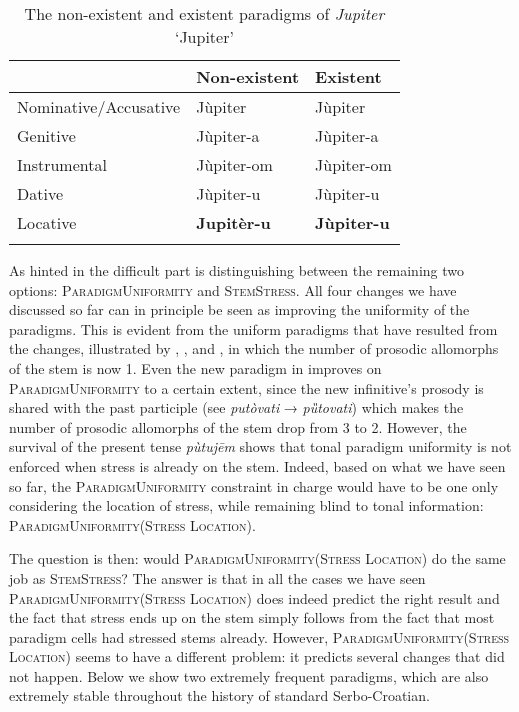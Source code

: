 \documentclass[output=paper,modfonts,nonflat
]{langsci/langscibook}
\begin{document}
\begin{table}
\caption{The non-existent and existent paradigms of \textit{Jupiter} `Jupiter'}
\label{tab:kager:7}
\begin{tabular}{  l l l }
  \lsptoprule
& Non-existent  & Existent\\ 
 \midrule
Nominative/Accusative  &  Jùpiter  &   Jùpiter\\
Genitive  &  Jùpiter-a  & Jùpiter-a\\
Instrumental  &  Jùpiter-om & Jùpiter-om\\
Dative  & Jùpiter-u & Jùpiter-u\\
Locative  & \textbf{Jupitèr-u} & \textbf{Jùpiter-u}\\
  \lspbottomrule
 \end{tabular}
\end{table}

As hinted in  the difficult part is distinguishing between the remaining two options: \textsc{ParadigmUniformity} and \textsc{StemStress}. All four changes we have discussed so far can in principle be seen as improving the uniformity of the paradigms. This is evident from the uniform paradigms that have resulted from the changes, illustrated by , , and , in which the number of prosodic allomorphs of the stem is now 1. Even the new paradigm in   improves on \textsc{ParadigmUniformity} to a certain extent, since the new infinitive's prosody is shared with the past participle (see \textit{putòvati} → \textit{pȕtovati}) which makes the number of prosodic allomorphs of the stem drop from 3 to 2. However, the survival of the present tense \textit{pùtujēm} shows that tonal paradigm uniformity is not enforced when stress is already on the stem. Indeed, based on what we have seen so far, the \textsc{ParadigmUniformity} constraint in charge would have to be one only considering the location of stress, while remaining blind to tonal information: \textsc{ParadigmUniformity(Stress Location)}. 

The question is then: would \textsc{ParadigmUniformity(Stress Location)} do the same job as \textsc{StemStress}? The answer is that in all the cases we have seen \textsc{ParadigmUniformity(Stress Location)} does indeed predict the right result and the fact that stress ends up on the stem simply follows from the fact that most paradigm cells had stressed stems already. However, \textsc{ParadigmUniformity(Stress Location)} seems to have a different problem: it predicts several changes that did not happen. Below we show two extremely frequent paradigms, which are also extremely stable throughout the history of standard Serbo-Croatian.
\end{document}
